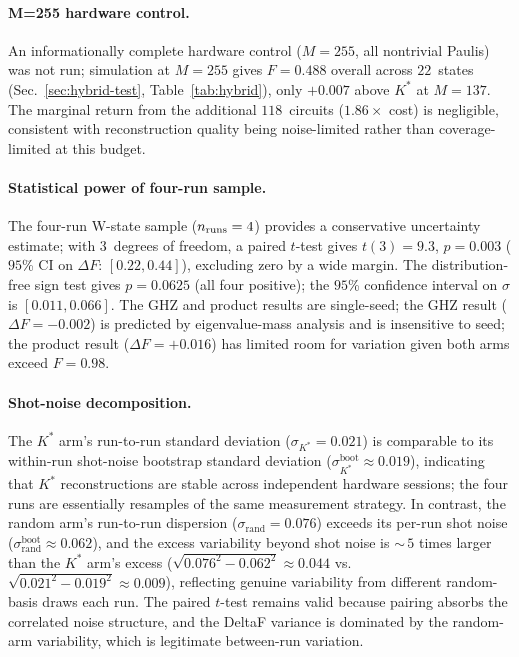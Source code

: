 \documentclass[twocolumn,prx,aps,superscriptaddress,longbibliography]{revtex4-2}
\begin{document}
\paragraph{M=255 hardware control.}
An informationally complete hardware control ($M = 255$, all
nontrivial Paulis) was not run; simulation at $M = 255$ gives
$F = 0.488$ overall across $22$~states
(Sec.~\ref{sec:hybrid-test}, Table~\ref{tab:hybrid}),
only $+0.007$ above $K^*$ at $M = 137$.  The marginal return
from the additional $118$~circuits ($1.86\times$ cost) is
negligible, consistent with reconstruction quality being
noise-limited rather than coverage-limited at this budget.

\paragraph{Statistical power of four-run sample.}
The four-run W-state sample ($n_{\rm runs} = 4$) provides a
conservative uncertainty estimate; with $3$~degrees of freedom,
a paired $t$-test gives $t(3) = 9.3$, $p = 0.003$
($95$\% CI on $\Delta F$: $[0.22, 0.44]$), excluding zero by
a wide margin.  The distribution-free sign test gives
$p = 0.0625$ (all four positive); the $95$\% confidence
interval on $\sigma$ is $[0.011, 0.066]$.  The GHZ and product results
are single-seed; the GHZ result ($\Delta F = -0.002$) is predicted
by eigenvalue-mass analysis and is insensitive to seed; the
product result ($\Delta F = +0.016$) has limited room for variation
given both arms exceed $F = 0.98$.

\paragraph{Shot-noise decomposition.}
The $K^*$ arm's run-to-run standard deviation
($\sigma_{K^*} = 0.021$) is comparable to its within-run
shot-noise bootstrap standard deviation
($\sigma_{K^*}^{\mathrm{boot}} \approx 0.019$),
indicating that $K^*$ reconstructions are stable across
independent hardware sessions; the four runs are essentially
resamples of the same measurement strategy.  In contrast, the
random arm's run-to-run dispersion
($\sigma_{\mathrm{rand}} = 0.076$) exceeds its per-run
shot noise ($\sigma_{\mathrm{rand}}^{\mathrm{boot}} \approx 0.062$),
and the excess variability beyond shot noise is ${\sim}\,5$
times larger than the $K^*$ arm's excess
($\sqrt{0.076^2 - 0.062^2} \approx 0.044$ vs.\
$\sqrt{0.021^2 - 0.019^2} \approx 0.009$),
reflecting genuine variability from
different random-basis draws each run.  The paired $t$-test
remains valid because pairing absorbs the correlated noise
structure, and the DeltaF variance is dominated by the
random-arm variability, which is legitimate between-run variation.
\end{document}
